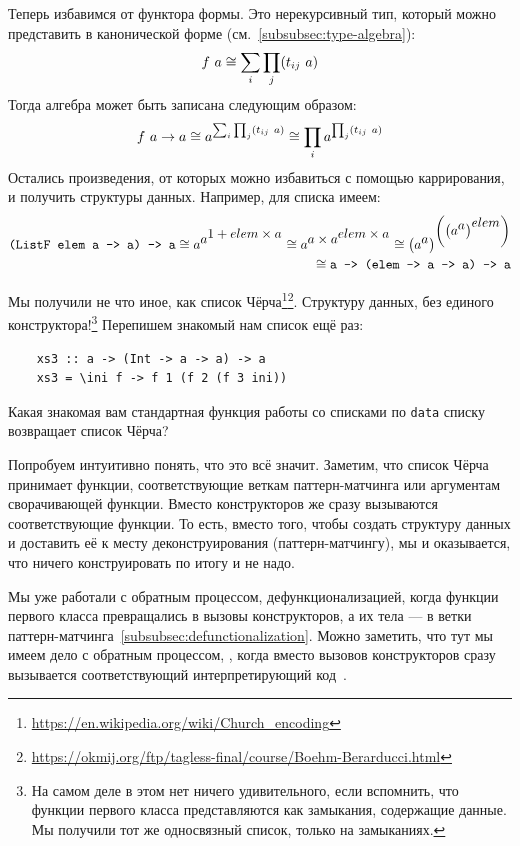 Теперь избавимся от функтора формы.
Это нерекурсивный тип, который можно представить в канонической форме (см.~\ref{subsubsec:type-algebra}):
\[
    f~ a \cong \sum_{i}\prod_{j} (t_{ij}~ a)
\]
Тогда алгебра может быть записана следующим образом:
\[
    f~ a\to a\cong a^{\sum_{i}\prod_{j} (t_{ij}~ a)} \cong \prod_{i}a^{\prod_{j} (t_{ij}~ a)}
\]
Остались произведения, от которых можно избавиться с помощью каррирования, и получить  структуры данных.
Например, для списка имеем:
\begin{align*}
    \text{\texttt{(ListF elem a -> a) -> a}}
    \cong a^{\displaystyle a^{\displaystyle 1 + elem\times a}}
    \cong a^{\displaystyle a\times a^{\displaystyle elem\times a}}
    \cong \left( a^{\displaystyle a} \right)^{\displaystyle \left(\left( a^{\displaystyle a}\right)^{\displaystyle elem}\right)} \\
    \cong \text{\texttt{a -> (elem -> a -> a) -> a}}
\end{align*}

Мы получили не что иное, как список Чёрча\footnote{\url{https://en.wikipedia.org/wiki/Church_encoding}}\footnote{\url{https://okmij.org/ftp/tagless-final/course/Boehm-Berarducci.html}}.
Структуру данных, без единого конструктора!\footnote{На самом деле в этом нет ничего удивительного, если вспомнить, что функции первого класса представляются как замыкания, содержащие данные. Мы получили тот же односвязный список, только на замыканиях.}
Перепишем знакомый нам список ещё раз:
\begin{verbatim}
    xs3 :: a -> (Int -> a -> a) -> a
    xs3 = \ini f -> f 1 (f 2 (f 3 ini))
\end{verbatim}

\begin{task}
    Какая знакомая вам стандартная функция работы со списками по \texttt{data} списку возвращает список Чёрча?
\end{task}

Попробуем интуитивно понять, что это всё значит.
Заметим, что список Чёрча принимает функции, соответствующие веткам паттерн-матчинга или аргументам сворачивающей функции.
Вместо конструкторов же сразу вызываются соответствующие функции.
То есть, вместо того, чтобы создать структуру данных и доставить её к месту деконструирования (паттерн-матчингу), мы  и оказывается, что ничего конструировать по итогу и не надо.

Мы уже работали с обратным процессом, дефункционализацией, когда функции первого класса превращались в вызовы конструкторов, а их тела --- в ветки паттерн-матчинга~\ref{subsubsec:defunctionalization}.
Можно заметить, что тут мы имеем дело с обратным процессом, , когда вместо вызовов конструкторов сразу вызывается соответствующий интерпретирующий код~\cite{DANVY2009534}.

